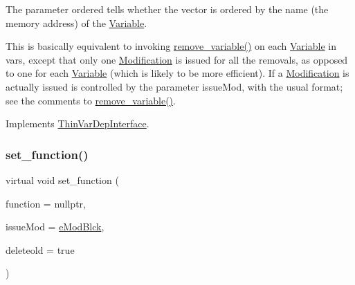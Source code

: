 The parameter ordered tells whether the vector is ordered by the name (the memory address) of the \mbox{\hyperlink{class_s_m_spp__di__unipi__it_1_1_variable}{Variable}}.

This is basically equivalent to invoking \mbox{\hyperlink{class_s_m_spp__di__unipi__it_1_1_f_real_objective_ade52d9ebf47de895377b860ef4d3a607}{remove\+\_\+variable()}} on each \mbox{\hyperlink{class_s_m_spp__di__unipi__it_1_1_variable}{Variable}} in vars, except that only one \mbox{\hyperlink{class_s_m_spp__di__unipi__it_1_1_modification}{Modification}} is issued for all the removals, as opposed to one for each \mbox{\hyperlink{class_s_m_spp__di__unipi__it_1_1_variable}{Variable}} (which is likely to be more efficient). If a \mbox{\hyperlink{class_s_m_spp__di__unipi__it_1_1_modification}{Modification}} is actually issued is controlled by the parameter issue\+Mod, with the usual format; see the comments to \mbox{\hyperlink{class_s_m_spp__di__unipi__it_1_1_f_real_objective_ade52d9ebf47de895377b860ef4d3a607}{remove\+\_\+variable()}}. 

Implements \mbox{\hyperlink{group___thin_var_dep_interface___c_l_a_s_s_e_s_ga4f21d262d25ed93ccc289134f2618ba9}{Thin\+Var\+Dep\+Interface}}.

\mbox{\label{class_s_m_spp__di__unipi__it_1_1_f_real_objective_a91173cc091286d4bc102d8f54d564c1e}} 
\subsubsection{\texorpdfstring{set\+\_\+function()}{set\_function()}}
{\footnotesize\ttfamily virtual void set\+\_\+function (\begin{DoxyParamCaption}\item[{\mbox{\hyperlink{class_s_m_spp__di__unipi__it_1_1_function}{Function}} $\ast$const}]{function = {\ttfamily nullptr},  }\item[{\mbox{\hyperlink{group___modification___t_y_p_e_s_ga544246d8c462e9a2d817c2c30797968f}{c\+\_\+\+Mod\+Param}}}]{issue\+Mod = {\ttfamily \mbox{\hyperlink{group___modification___t_y_p_e_s_gga48fddcdd03a03f49b7e389ca1ed938d4a21b14b26b1c0093a0905f6fc010bad29}{e\+Mod\+Blck}}},  }\item[{bool}]{deleteold = {\ttfamily true} }\end{DoxyParamCaption})\hspace{0.3cm}{\ttfamily [virtual]}}



